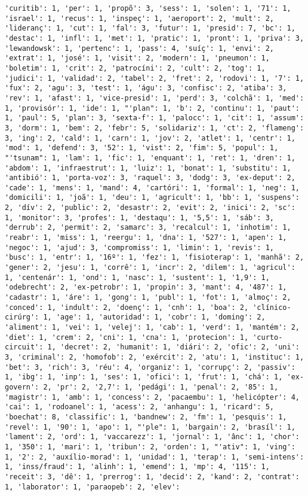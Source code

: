 \documentclass[11pt]{article}
\begin{document}
\begin{Verbatim}[commandchars=\\\{\}]
'curitib': 1, 'per': 1, 'propõ': 3, 'sess': 1, 'solen': 1, '71': 1, 'israel': 1, 'recus': 1, 'inspeç': 1, 'aeroport': 2, 'mult': 2, 'lideranç': 1, 'cut': 1, 'fal': 3, 'futur': 1, 'presid': 7, 'bc': 1, 'destac': 1, 'infl': 1, 'met': 1, 'pratic': 1, 'pront': 1, 'priva': 3, 'lewandowsk': 1, 'pertenc': 1, 'pass': 4, 'suíç': 1, 'envi': 2, 'extrat': 1, 'josé': 1, 'visit': 2, 'modern': 1, 'pneumon': 1, 'boletim': 1, 'crit': 2, 'patrocíni': 2, 'cult': 2, 'tog': 1, 'judici': 1, 'validad': 2, 'tabel': 2, 'fret': 2, 'rodovi': 1, '7': 1, 'fux': 2, 'agu': 3, 'test': 1, 'águ': 3, 'confisc': 2, 'atiba': 3, 'rev': 1, 'afast': 1, 'vice-presid': 1, 'perd': 3, 'colchã': 1, 'med': 1, 'provisór': 1, 'ide': 1, "'plan": 1, 'b': 2, 'continu': 1, 'paut': 1, 'paul': 5, 'plan': 3, 'sexta-f': 1, 'palocc': 1, 'cit': 1, 'assum': 3, 'dorm': 1, 'bem': 2, 'febr': 5, 'solidariz': 1, 'ct': 2, 'flameng': 3, 'ing': 2, 'cald': 1, 'carn': 1, 'jov': 2, 'atlet': 1, 'centr': 1, 'mod': 1, 'defend': 3, '52': 1, 'vist': 2, 'fim': 5, 'popul': 1, "'tsunam": 1, 'lam': 1, 'fic': 1, 'enquant': 1, 'ret': 1, 'dren': 1, 'abdom': 1, 'infraestrut': 1, 'luiz': 1, 'bonat': 1, 'substitu': 1, 'antibió': 1, 'porta-voz': 3, 'raquel': 3, 'dodg': 3, 'ex-deput': 2, 'cade': 1, 'mens': 1, 'mand': 4, 'cartóri': 1, 'formal': 1, 'neg': 1, 'domicili': 1, 'joã': 1, 'deu': 1, 'agricult': 1, 'bb': 1, 'suspens': 2, 'dív': 2, 'public': 2, 'desastr': 2, 'evit': 2, 'inici': 2, 'sc': 1, 'monitor': 3, 'profes': 1, 'destaqu': 1, '5,5': 1, 'sáb': 3, 'derrub': 2, 'permit': 2, 'samarc': 3, 'recalcul': 1, 'inhotim': 1, 'reabr': 1, 'miss': 1, 'reergu': 1, 'dna': 1, '527': 1, 'apen': 1, 'negoc': 1, 'ajud': 3, 'compromiss': 1, 'limin': 1, 'revis': 1, 'busc': 1, 'entr': 1, '16º': 1, 'fez': 1, 'fisioterap': 1, 'manhã': 2, 'gener': 2, 'jesu': 1, 'corrê': 1, 'incr': 2, 'dilem': 1, 'agricul': 1, 'centenár': 1, 'ond': 1, 'nasc': 1, 'sustent': 1, '1,9': 1, 'odebrecht': 2, 'ex-petrobr': 1, 'propin': 3, 'mant': 4, '487': 1, 'cadastr': 1, 'áre': 1, 'gong': 1, 'publ': 1, 'fot': 1, 'almoç': 2, 'conced': 1, 'indult': 2, 'doenç': 1, 'cnh': 1, 'boa': 2, 'clínico-cirúrg': 1, 'age': 1, 'autoridad': 1, 'cobr': 1, 'doming': 2, 'aliment': 1, 'vei': 1, 'velej': 1, 'cab': 1, 'verd': 1, 'mantém': 2, 'diet': 1, 'crem': 2, 'cni': 1, 'cna': 1, 'protecion': 1, 'curto-circuit': 1, 'decret': 2, 'humanit': 1, 'diári': 2, 'ofic': 2, 'uni': 3, 'criminal': 2, 'homofob': 2, 'exércit': 2, 'atu': 1, 'instituc': 1, 'bet': 3, 'rich': 3, 'réu': 4, 'organiz': 1, 'corrupç': 2, 'passiv': 1, 'ibg': 1, 'inp': 1, 'ses': 1, 'ofici': 1, 'frut': 1, 'chá': 1, 'ex-govern': 2, 'pr': 2, '2,7': 1, 'pedági': 1, 'penal': 2, '85': 1, 'magistr': 1, 'amb': 1, 'concess': 2, 'pacaembu': 1, 'helicópter': 4, 'cai': 1, 'rodoanel': 1, 'acess': 2, 'anhangu': 1, 'ricard': 5, 'boechat': 8, 'classific': 1, 'bandnew': 2, 'fm': 1, 'pesquis': 1, 'revel': 1, '90': 1, 'apo': 1, "'ple": 1, 'bargain': 2, 'brasíl': 1, 'lament': 2, 'ord': 1, 'vaccarezz': 1, 'jornal': 1, 'ânc': 1, 'chor': 1, '350': 1, 'mari': 1, 'tribun': 2, 'orden': 1, "'ativ": 1, 'ving': 1, '2': 2, 'auxílio-morad': 1, 'unidad': 1, 'terap': 1, 'semi-intens': 1, 'inss/fraud': 1, 'alinh': 1, 'emend': 1, 'mp': 4, '115': 1, 'receit': 3, 'dê': 1, 'prerrog': 1, 'decid': 2, 'kand': 2, 'contrat': 1, 'laborator': 1, 'paraopeb': 2, 'elev': 
\end{Verbatim}
\end{document}

